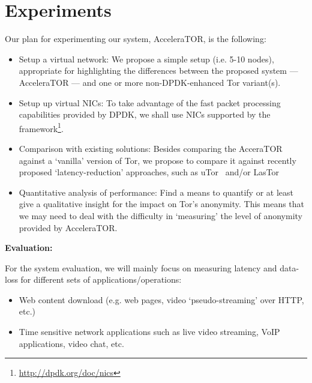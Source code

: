 \documentclass[conference]{IEEEtran}
\begin{document}
\section{Experiments}
Our plan for experimenting our system, AcceleraTOR, is the following:
\begin{itemize}
	
	\item Setup a virtual network: We propose a simple setup (i.e. 5-10 nodes), appropriate for highlighting the differences between the proposed system --- AcceleraTOR --- and one or more non-DPDK-enhanced Tor variant(s).
	
	\item Setup up virtual NICs: To take advantage of the fast packet processing capabilities provided by DPDK, we shall use NICs supported by the framework\footnote{\url{http://dpdk.org/doc/nics}}.

	\item Comparison with existing solutions: Besides comparing the AcceraTOR against a `vanilla' version of Tor, we propose to compare it against recently proposed `latency-reduction' approaches, such as uTor~\cite{179191} and/or LasTor~\cite{Akhoondi:2012:LLA:2310656.2310712}

	\item Quantitative analysis of performance: Find a means to quantify or at least give a qualitative insight for the impact on Tor's anonymity. This means that we may need to deal with the difficulty in `measuring' the level of anonymity provided by AcceleraTOR. 

\end{itemize}

\textbf{Evaluation:}

For the system evaluation, we will mainly focus on measuring latency and data-loss for different sets of applications\slash operations:

\begin{itemize}

	\item Web content download (e.g. web pages, video ‘pseudo-streaming’ over HTTP, etc.)
	\item Time sensitive network applications such as live video streaming, VoIP applications, video chat, etc.

\end{itemize}



%

\end{document}
